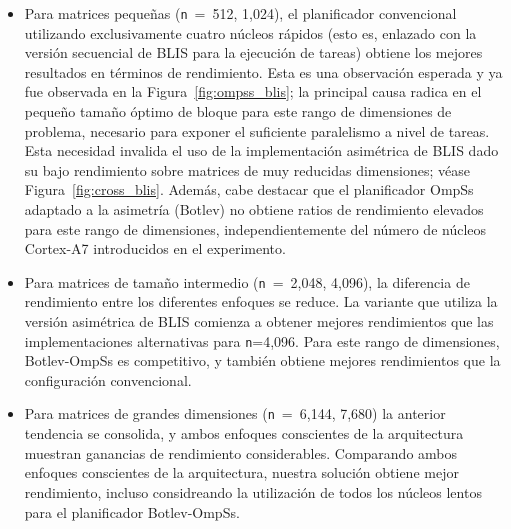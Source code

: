 \begin{itemize}
	\item Para matrices pequeñas ({\tt n}~=~512, 1,024), el planificador convencional utilizando exclusivamente cuatro núcleos rápidos (esto es,
		enlazado con la versión secuencial de BLIS para la ejecución de tareas) obtiene los mejores resultados en términos de rendimiento.
		Esta es una observación esperada y ya fue observada en la Figura~\ref{fig:ompss_blis}; la principal causa radica en el pequeño tamaño óptimo
		de bloque para este rango de dimensiones de problema, necesario para exponer el suficiente paralelismo a nivel de tareas. Esta necesidad invalida
		el uso de la implementación asimétrica de BLIS dado su bajo rendimiento sobre matrices de muy reducidas dimensiones; véase Figura~\ref{fig:cross_blis}. 
		Además, cabe destacar que el planificador OmpSs adaptado a la asimetría (Botlev) no obtiene ratios de rendimiento elevados para este rango de 
		dimensiones, independientemente del número de núcleos Cortex-A7 introducidos en el experimento.

 \item Para matrices de tamaño intermedio ({\tt n}~=~2,048, 4,096), la diferencia de rendimiento entre los diferentes enfoques se reduce.
	 La variante que utiliza la versión asimétrica de BLIS comienza a obtener mejores rendimientos que las implementaciones alternativas para
{\tt n}=4,096. Para este rango de dimensiones, Botlev-OmpSs es competitivo, y también obtiene mejores rendimientos que la configuración convencional.

 \item Para matrices de grandes dimensiones ({\tt n}~=~6,144, 7,680) la anterior tendencia se consolida, y ambos enfoques conscientes de la arquitectura muestran
	 ganancias de rendimiento considerables. Comparando ambos enfoques conscientes de la arquitectura, nuestra solución
obtiene mejor rendimiento, incluso considreando la utilización de todos los núcleos lentos para el planificador Botlev-OmpSs.

\end{itemize}

